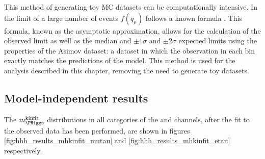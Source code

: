 This method of generating toy MC datasets can be computationally intensive.
In the limit of a large number of events $f(q_{\mu})$ follows a known formula \cite{AsymptoticFormula}.
This formula, known as the asymptotic approximation, allows for the calculation
of the observed limit as well as the median and $\pm 1\sigma$ and $\pm 2\sigma$ expected limits using
the properties of the Asimov dataset: a dataset in which the observation in 
each bin exactly matches the predictions of the model. This method is used for the analysis
described in this chapter, removing the need to generate toy datasets.

\subsection{Model-independent results}
\label{sec:hhh_results_modelindep}

The $m_{\PHiggs}^{\text{kinfit}}$ distributions in all categories of the \mutau and \etau channels, after the fit to the
observed data has been performed, are shown in figures \ref{fig:hhh_results_mhkinfit_mutau} and \ref{fig:hhh_results_mhkinfit_etau} 
respectively.

